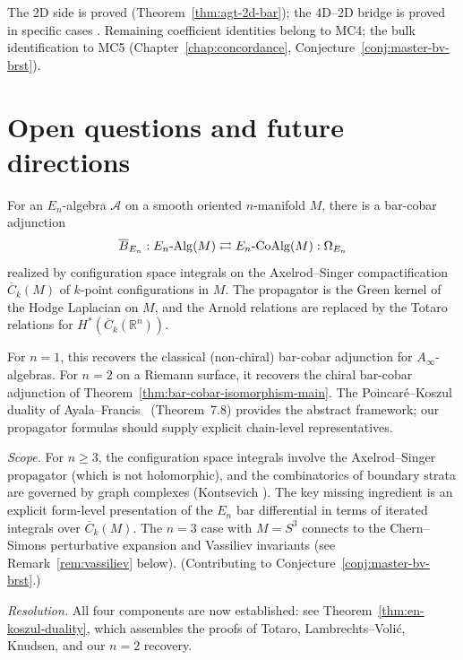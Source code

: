 \begin{remark}[Scope]
The 2D side is proved (Theorem~\ref{thm:agt-2d-bar}); the 4D--2D bridge is proved in specific cases \cite{SV13,MO19}.  Remaining coefficient identities belong to MC4; the bulk identification to MC5 (Chapter~\ref{chap:concordance}, Conjecture~\ref{conj:master-bv-brst}).
\end{remark}



\section{Open questions and future directions}
\label{sec:open-questions-holo-topo}

\begin{theorem}\label{thm:en-koszul}
For an $E_n$-algebra $\mathcal{A}$ on a smooth oriented $n$-manifold $M$,
there is a bar-cobar adjunction
\begin{equation}\label{eq:en-bar-cobar}
\overline{B}_{E_n}: E_n\text{-}\mathrm{Alg}(M)
\rightleftarrows
E_n\text{-}\mathrm{CoAlg}(M) :\Omega_{E_n}
\end{equation}
realized by configuration space integrals on the Axelrod--Singer
compactification $\overline{C}_k(M)$ of $k$-point configurations in $M$.
The propagator is the Green kernel of the Hodge Laplacian on $M$, and
the Arnold relations are replaced by the Totaro relations
\cite{Totaro96} for $H^*(\overline{C}_k(\mathbb{R}^n))$.

For $n = 1$, this recovers the classical (non-chiral) bar-cobar
adjunction for $A_\infty$-algebras.  For $n = 2$ on a Riemann surface,
it recovers the chiral bar-cobar adjunction of
Theorem~\textup{\ref{thm:bar-cobar-isomorphism-main}}.
The Poincar\'e--Koszul duality of Ayala--Francis~\cite{AF15}
\textup{(}Theorem~7.8\textup{)} provides the abstract framework;
our propagator formulas should supply explicit chain-level
representatives.

\emph{Scope.}  For $n \geq 3$, the configuration space integrals involve
the Axelrod--Singer propagator (which is not holomorphic), and the
combinatorics of boundary strata are governed by graph complexes
(Kontsevich \cite{Kon94}).  The key missing ingredient is an
explicit form-level presentation of the $E_n$ bar differential in terms
of iterated integrals over $\overline{C}_k(M)$.  The $n = 3$ case
with $M = S^3$ connects to the Chern--Simons perturbative expansion and
Vassiliev invariants (see Remark~\textup{\ref{rem:vassiliev}} below).
(Contributing to Conjecture~\ref{conj:master-bv-brst}.)

\emph{Resolution.}  All four components are now
established: see Theorem~\textup{\ref{thm:en-koszul-duality}}, which
assembles the proofs of Totaro, Lambrechts--Voli\'c, Knudsen, and
our $n = 2$ recovery.
\end{theorem}


